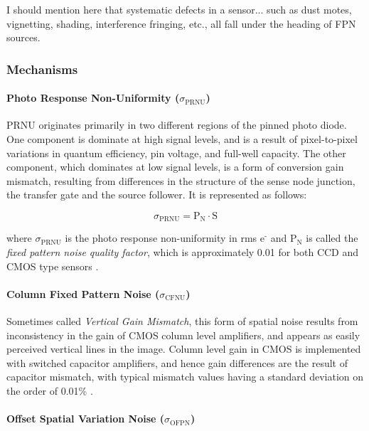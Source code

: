 \documentclass[10pt]{article}
\begin{document}
I should mention here that systematic defects in a sensor... such as dust motes, vignetting, shading, interference fringing, etc., all fall under the heading of FPN sources. 

\subsubsection{Mechanisms}

\paragraph{Photo Response Non-Uniformity (\boldmath $\sigma_{\text{PRNU}}$)}

PRNU originates primarily in two different regions of the pinned photo diode. One component is dominate at high signal levels, and is a result of pixel-to-pixel variations in quantum efficiency, pin voltage, and full-well capacity. The other component, which dominates at low signal levels, is a form of conversion gain mismatch, resulting from differences in the structure of the sense node junction, the transfer gate and the source follower. It is represented as follows:

$$ \sigma_{\text{PRNU}} = \text{P}_{\text{N}} \cdot \text{S}$$

\vspace{2mm}

\noindent where $\sigma_{\text{PRNU}}$ is the photo response non-uniformity in rms $\text{e}^{\text{-}}$ and $\text{P}_{\text{N}}$ is called the \emph{fixed pattern noise quality factor}, which is approximately 0.01 for both CCD and CMOS type sensors \cite{janesick}.

\paragraph{Column Fixed Pattern Noise (\boldmath $\sigma_{\text{CFNU}}$)}

Sometimes called \emph{Vertical Gain Mismatch}, this form of spatial noise results from inconsistency in the gain of CMOS column level amplifiers, and appears as easily perceived vertical lines in the image. Column level gain in CMOS is implemented with switched capacitor amplifiers, and hence gain differences are the result of capacitor mismatch, with typical mismatch values having a standard deviation on the order of 0.01\% \cite{boukhayma}.

\paragraph{Offset Spatial Variation Noise (\boldmath $\sigma_{\text{OFPN}}$)}
\end{document}
